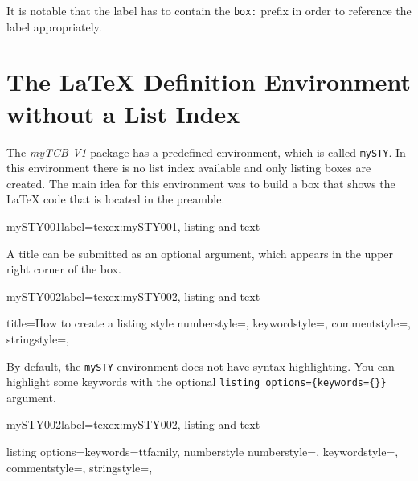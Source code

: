 \documentclass[]{myHOWTO-V001}
\begin{document}
It is notable that the label has to contain the \Verb|box:| prefix in order to reference the label appropriately.

%
%

\section{The \LaTeX{} Definition Environment without a List Index}

The \emph{myTCB-V1} package has a predefined environment, which is called \Verb|mySTY|. In this environment there is no list index available and only listing boxes are created. The main idea for this environment was to build a box that shows the \LaTeX{} code that is located in the preamble.

\begin{myTEXEXdoclst}{mySTY001}{label={texex:mySTY001}, listing and text}
\end{myTEXEXdoclst}

A title can be submitted as an optional argument, which appears in the upper right corner of the box.

\begin{myTEXEXdoclst}{mySTY002}{label={texex:mySTY002}, listing and text}
\begin{mySTY}{title={How to create a listing style}}
{
	numberstyle={\scriptsize\ttfamily},
	keywordstyle={\scriptsize\ttfamily},
	commentstyle={\scriptsize\ttfamily},
	stringstyle={\scriptsize\ttfamily},
}
\end{mySTY}
\end{myTEXEXdoclst}

\newpage

By default, the \Verb|mySTY| environment does not have syntax highlighting. You can highlight some keywords with the optional \verb|listing options={keywords={}}| argument.

\begin{myTEXEXdoclst}{mySTY002}{label={texex:mySTY002}, listing and text}
\begin{mySTY}{listing options={keywords={ttfamily, numberstyle}}}
{
	numberstyle={\scriptsize\ttfamily},
	keywordstyle={\scriptsize\ttfamily},
	commentstyle={\scriptsize\ttfamily},
	stringstyle={\scriptsize\ttfamily},
}
\end{mySTY}
\end{myTEXEXdoclst}
\end{document}
